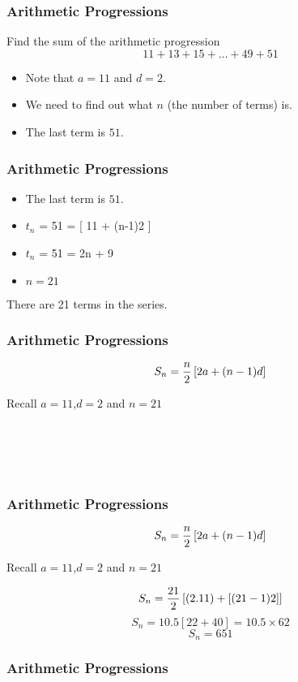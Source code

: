 
\frametitle{Arithmetic Progressions}

Find the sum of the arithmetic progression
{
\[ 11 + 13 + 15 + \dots + 49 + 51 \]
}
\begin{itemize}
\item Note that $a=11$ and $d=2$.
\item We need to find out what $n$ (the number of terms) is.
\item The last term is $51$.
\end{itemize}



\frametitle{Arithmetic Progressions}

\begin{itemize}
\item The last term is $51$.
\item $t_n$ = 51 = [ 11 + (n-1)2 ] 
\item $t_n$ = 51 = 2n + 9
\item $n=21$
\end{itemize}
There are 21 terms in the series.



\frametitle{Arithmetic Progressions}

\[ S_n  = {n \over 2} \left[ 2a+(n-1)d \right] \]

Recall $a=11$,$d=2$ and $n=21$


\[ \phantom{S_n  = {21 \over 2} \left[ (2.11) +[(21-1)2] \right]} \]
\[ \phantom{S_n  = 10.5 \left[ 22 + 40 \right]  = 10.5 \times 62}\]
\[ \phantom{S_n  = 651} \] 



\frametitle{Arithmetic Progressions}

\[ S_n  = {n \over 2} \left[ 2a+(n-1)d \right] \]

Recall $a=11$,$d=2$ and $n=21$


\[ S_n  = {21 \over 2} \left[ (2.11) +[(21-1)2] \right] \]
\[ S_n  = 10.5 \left[ 22 + 40 \right]  = 10.5 \times 62\]
\[ S_n  = 651 \] 



\frametitle{Arithmetic Progressions}

